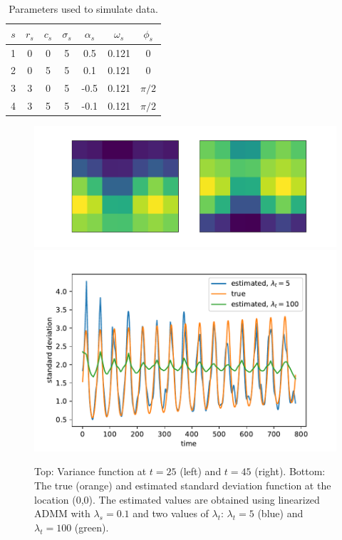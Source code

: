 \documentclass[letterpaper]{article} %
\begin{document}
\begin{table}[tb]
  \caption{Parameters used to simulate data.}
  \label{tab:sim_params}
  \begin{center}
    \begin{tabular}{ccccccc}
      \hline
      $s$ & $r_s$ & $c_s$ & $\sigma_s$ &$\alpha_s$ & $\omega_s$ & $\phi_s$\\
      \hline
      1 & 0 & 0 & 5 & 0.5 & 0.121 & 0 \\
      2 & 0 & 5 & 5 & 0.1 & 0.121 & 0 \\
      3 & 3 & 0 & 5 & -0.5 & 0.121 & $\pi/2$ \\
      4 & 3 & 5 & 5 & -0.1 & 0.121 & $\pi/2$ \\
      \hline
    \end{tabular}
  \end{center}
\end{table} 

\begin{figure}[tb]
  \centering	
  \includegraphics[height=.15\textheight]{Figures/true_var_spatial}\\
  \includegraphics[height=.15\textheight]{Figures/true_fitted_var}
  \caption{Top: Variance function at $t=25$ (left) and $t=45$
    (right). Bottom: The true (orange) and estimated standard deviation 
    function at the location (0,0). The estimated values are
    obtained using linearized ADMM with $\lambda_s=0.1$ and two
    values of $\lambda_t$: $\lambda_t=5$ (blue) and
    $\lambda_t=100$ (green).} \label{fig:true_var_spatial}
\end{figure}
\end{document}
